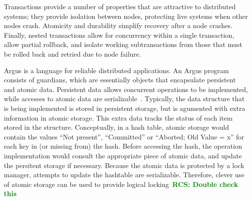 \documentclass[letterpaper,twocolumn,10pt]{article}
\newcommand{\rcs}[1]{\textcolor{green}{\bf RCS: #1}}
\begin{document}



Transactions provide a number of properties that are attractive to
distributed systems; they provide isolation between nodes, protecting
live systems when other nodes crash.  Atomicity and durability
simplify recovery after a node crashes.  Finally, nested transactions
allow for concurrency within a single transaction, allow partial
rollback, and isolate working subtransactions from those that must be
rolled back and retried due to node failure.

Argus is a language for reliable distributed applications.  An Argus
program consists of guardians, which are essentially objects that
encapsulate persistent and atomic data.  Persistent data allows
concurrent operations to be implemented, while accesses to atomic data
are serializable~\cite{argus}.  Typically, the data structure that is being
implemented is stored in persistent storage, but is agumented with
extra information in atomic storage.  This extra data tracks the
status of each item stored in the structure.  Conceptually, in a hash
table, atomic storage would contain the values ``Not present'',
``Committed'' or ``Aborted; Old Value = x'' for each key in (or
missing from) the hash.  Before accessing the hash, the operation
implementation would consult the appropriate piece of atomic data, and
update the persitent storage if necessary.  Because the atomic data is
protected by a lock manager, attempts to update the hashtable are serializable.
Therefore, clever use of atomic storage can be used to provide logical locking~\rcs{Double check this}
\end{document}
